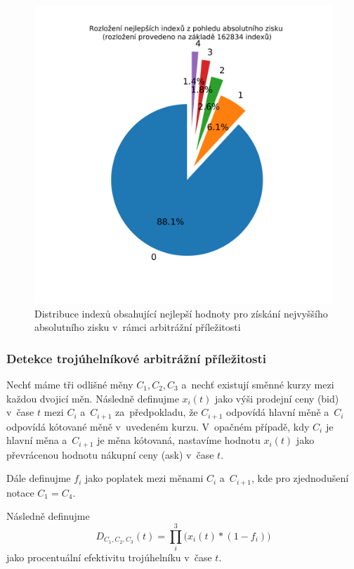 \documentclass[thesis=B,czech]{FITthesis}[2019/03/21]
\begin{document}
\begin{figure}\centering
	\includegraphics[width=1\textwidth]{images/index_distribution.png}
	\caption{Distribuce indexů obsahující nejlepší hodnoty pro získání nejvyššího absolutního zisku v~rámci arbitrážní příležitosti}\label{index_distribution}
\end{figure}
\subsubsection{Detekce trojúhelníkové arbitrážní příležitosti}
Nechť máme tři odlišné měny \(C_1,C_2,C_3\) a~nechť existují směnné kurzy mezi každou dvojicí měn. Následně definujme \(x_i(t)\) jako výši prodejní ceny (bid) v~čase \(t\) mezi \(C_i\) a~\(C_{i+1}\) za~předpokladu, že \(C_{i+1}\) odpovídá hlavní měně a~\(C_{i}\) odpovídá kótované měně v~uvedeném kurzu. V~opačném případě, kdy \(C_{i}\) je hlavní měna a~\(C_{i+1}\) je měna kótovaná, nastavíme hodnotu \(x_i(t)\) jako převrácenou hodnotu nákupní ceny (ask) v~čase \(t\).

Dále definujme \(f_i\) jako poplatek mezi měnami \(C_i\) a~\(C_{i+1}\), kde pro zjednodušení notace \(C_1 = C_4\).

Následně definujme
\[D_{C_1,C_2,C_3}(t) = \prod_i^3\Big(x_i(t)*(1-f_i)\Big)\]
jako procentuální efektivitu trojúhelníku v~čase \(t\).
\end{document}

